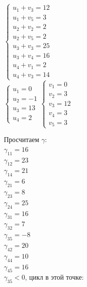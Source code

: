 \documentclass[a4paper,14pt]{extarticle}
\begin{document}
$\begin{cases}
    u_1 + v_3 = 12\\
    u_1 + v_5 = 3\\
    u_2 + v_2 = 2\\
    u_2 + v_5 = 2\\
    u_3 + v_3 = 25\\
    u_3 + v_4 = 16\\
    u_4 + v_1 = 2\\
    u_4 + v_3 = 14
\end{cases} $\\

$\begin{cases}
    u_1 = 0\\
    u_2 = -1\\
    u_3 = 13\\
    u_4 = 2
\end{cases} \begin{cases}
    v_1 = 0\\
    v_2 = 3\\
    v_3 = 12\\
    v_4 = 3\\
    v_5 = 3
\end{cases}$

Просчитаем $\gamma$:\\
$\gamma_{11} = 16$\\
$\gamma_{12} = 23$\\
$\gamma_{14} = 21$\\
$\gamma_{21} = 6$\\
$\gamma_{23} = 8$\\
$\gamma_{24} = 25$\\
$\gamma_{31} = 16$\\
$\gamma_{32} = 7$\\
$\gamma_{35} = -8$\\
$\gamma_{42} = 20$\\
$\gamma_{44} = 10$\\
$\gamma_{45} = 16$\\

$\gamma_{35} < 0$, цикл в этой точке:
\end{document}
